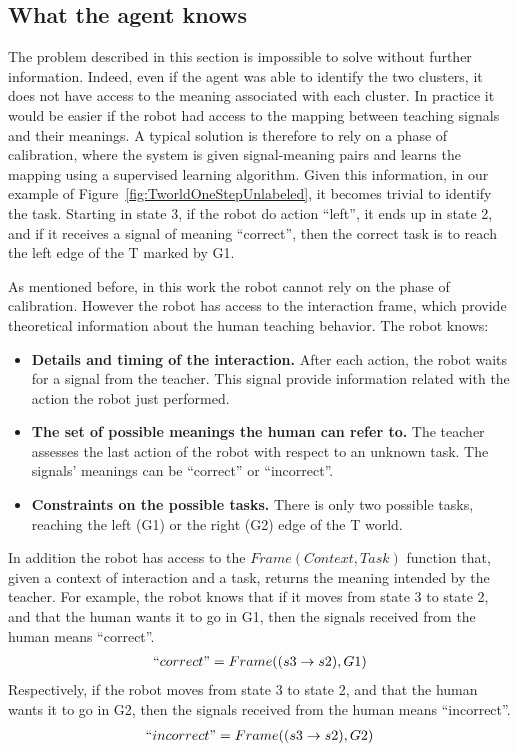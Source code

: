 \subsection{What the agent knows}

The problem described in this section is impossible to solve without further information. Indeed, even if the agent was able to identify the two clusters, it does not have access to the meaning associated with each cluster. In practice it would be easier if the robot had access to the mapping between teaching signals and their meanings. A typical solution is therefore to rely on a phase of calibration, where the system is given signal-meaning pairs and learns the mapping using a supervised learning algorithm. Given this information, in our example of Figure~\ref{fig:TworldOneStepUnlabeled}, it becomes trivial to identify the task. Starting in state 3, if the robot do action ``left'', it ends up in state 2, and if it receives a signal of meaning ``correct'', then the correct task is to reach the left edge of the T marked by G1.

As mentioned before, in this work the robot cannot rely on the phase of calibration. However the robot has access to the interaction frame, which provide theoretical information about the human teaching behavior. The robot knows:
\begin{itemize}

\item \textbf{Details and timing of the interaction.} After each action, the robot waits for a signal from the teacher. This signal provide information related with the action the robot just performed.

\item \textbf{The set of possible meanings the human can refer to.} The teacher assesses the last action of the robot with respect to an unknown task. The signals' meanings can be ``correct'' or ``incorrect''.

\item \textbf{Constraints on the possible tasks.} There is only two possible tasks, reaching the left (G1) or the right (G2) edge of the T world.

\end{itemize}

In addition the robot has access to the $Frame(Context,Task)$ function that, given a context of interaction and a task, returns the meaning intended by the teacher. For example, the robot knows that if it moves from state 3 to state 2, and that the human wants it to go in G1, then the signals received from the human means ``correct''.
%
\begin{eqnarray}
``correct" = Frame((s3 \rightarrow s2), G1) \nonumber
\end{eqnarray}
%
Respectively, if the robot moves from state 3 to state 2, and that the human wants it to go in G2, then the signals received from the human means ``incorrect''.
%
\begin{eqnarray}
``incorrect" = Frame((s3 \rightarrow s2), G2) \nonumber
\end{eqnarray}

